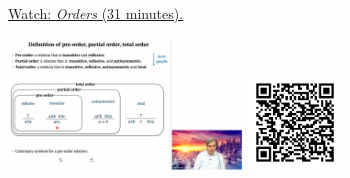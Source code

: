 
\begin{minipage}{10cm}
    \href{https://act4e-spring21.netlify.app/videos/spring2021-tradeoffs:tradeoffs:orders.html}{Watch: \emph{Orders} (31 minutes).}
        
    \href{https://act4e-spring21.netlify.app/videos/spring2021-tradeoffs:tradeoffs:orders.html}{\includegraphics[height=3.5cm]{spring2021-tradeoffs:tradeoffs:orders/thumbnails.jpg}}
    \href{https://act4e-spring21.netlify.app/videos/spring2021-tradeoffs:tradeoffs:orders.html}{\includegraphics[height=2.5cm]{spring2021-tradeoffs:tradeoffs:orders/qrcode.png}}
\end{minipage}
